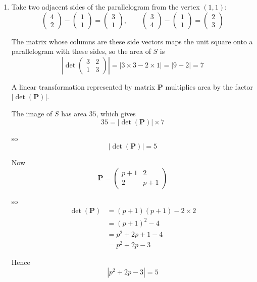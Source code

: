 \documentclass[leqno]{article}
\begin{document}
\begin{enumerate}[
  label=\textbf{\arabic*.},
  leftmargin=*,
  topsep=0pt,
  partopsep=0pt,
  parsep=0pt
]
\begin{djsSolution}
\begin{enumerate}[label=\textbf{(\alph*)}]
  \item Take two adjacent sides of the parallelogram from the vertex $(1,1)$:
\[
\begin{pmatrix}4\\2\end{pmatrix}-\begin{pmatrix}1\\1\end{pmatrix}
=
\begin{pmatrix}3\\1\end{pmatrix},
\qquad
\begin{pmatrix}3\\4\end{pmatrix}-\begin{pmatrix}1\\1\end{pmatrix}
=
\begin{pmatrix}2\\3\end{pmatrix}
\]

The matrix whose columns are these side vectors maps the unit square onto a parallelogram with these sides, so the area of $S$ is
\[
\left|\det\begin{pmatrix}3&2\\1&3\end{pmatrix}\right|
=|3\times 3-2\times 1|
=|9-2|
=7
\]

A linear transformation represented by matrix $\mathbf P$ multiplies area by the factor $|\det(\mathbf P)|$.

The image of $S$ has area $35$, which gives
\[
35=|\det(\mathbf P)|\times 7
\]

so
\[
|\det(\mathbf P)|=5
\]

Now
\[
\mathbf P=\begin{pmatrix}p+1&2\\2&p+1\end{pmatrix}
\]

so
\begin{align*}
\det(\mathbf P)
&=(p+1)(p+1)-2\times 2\\
&=(p+1)^2-4\\
&=p^2+2p+1-4\\
&=p^2+2p-3
\end{align*}

Hence
\[
|p^2+2p-3|=5
\]


\end{enumerate}
\end{djsSolution}
\end{enumerate}
\end{document}
